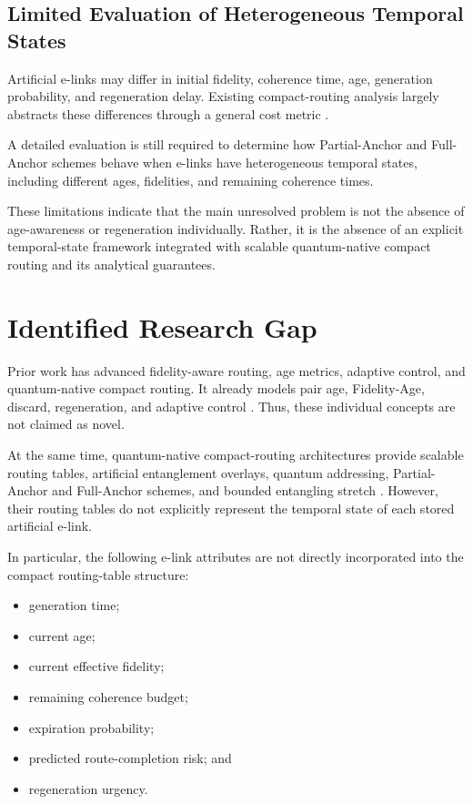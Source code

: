 \subsection{Limited Evaluation of Heterogeneous Temporal States}

Artificial e-links may differ in initial fidelity, coherence time, age, generation probability, and regeneration delay. Existing compact-routing analysis largely abstracts these differences through a general cost metric \cite{caleffi2025quantumarchitecture}.

A detailed evaluation is still required to determine how Partial-Anchor and Full-Anchor schemes behave when e-links have heterogeneous temporal states, including different ages, fidelities, and remaining coherence times.

These limitations indicate that the main unresolved problem is not the absence of age-awareness or regeneration individually. Rather, it is the absence of an explicit temporal-state framework integrated with scalable quantum-native compact routing and its analytical guarantees.

\section{Identified Research Gap}

Prior work has advanced fidelity-aware routing, age metrics, adaptive control,
and quantum-native compact routing. It already models pair age, Fidelity-Age,
discard, regeneration, and adaptive control
\cite{ercetin2026fidelityage,ceran2026age,wang2024fidelity,caleffi2025quantumarchitecture}.
Thus, these individual concepts are not claimed as novel.

At the same time, quantum-native compact-routing architectures provide scalable routing tables, artificial entanglement overlays, quantum addressing, Partial-Anchor and Full-Anchor schemes, and bounded entangling stretch \cite{caleffi2025quantumarchitecture}. However, their routing tables do not explicitly represent the temporal state of each stored artificial e-link.

In particular, the following e-link attributes are not directly incorporated into the compact routing-table structure:

\begin{itemize}
    \item generation time;
    \item current age;
    \item current effective fidelity;
    \item remaining coherence budget;
    \item expiration probability;
    \item predicted route-completion risk; and
    \item regeneration urgency.
\end{itemize}


